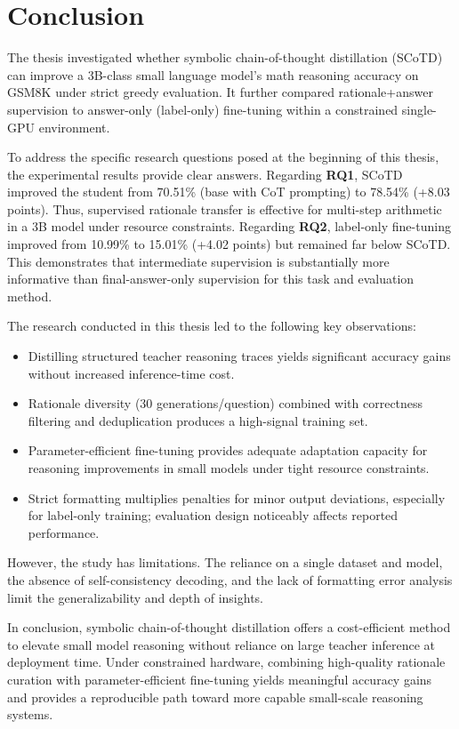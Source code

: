 \chapter{Conclusion}

The thesis investigated whether symbolic chain-of-thought distillation (SCoTD) can improve a 3B-class small language model's math reasoning accuracy on GSM8K under strict greedy evaluation. It further compared rationale+answer supervision to answer-only (label-only) fine-tuning within a constrained single-GPU environment.

To address the specific research questions posed at the beginning of this thesis, the experimental results provide clear answers. Regarding \textbf{RQ1}, SCoTD improved the student from 70.51\% (base with CoT prompting) to 78.54\% (+8.03 points). Thus, supervised rationale transfer is effective for multi-step arithmetic in a 3B model under resource constraints. Regarding \textbf{RQ2}, label-only fine-tuning improved from 10.99\% to 15.01\% (+4.02 points) but remained far below SCoTD. This demonstrates that intermediate supervision is substantially more informative than final-answer-only supervision for this task and evaluation method.

The research conducted in this thesis led to the following key observations:
\begin{itemize}
    \item Distilling structured teacher reasoning traces yields significant accuracy gains without increased inference-time cost.
    \item Rationale diversity (30 generations/question) combined with correctness filtering and deduplication produces a high-signal training set.
    \item Parameter-efficient fine-tuning provides adequate adaptation capacity for reasoning improvements in small models under tight resource constraints.
    \item Strict formatting multiplies penalties for minor output deviations, especially for label-only training; evaluation design noticeably affects reported performance.
\end{itemize}

However, the study has limitations. The reliance on a single dataset and model, the absence of self-consistency decoding, and the lack of formatting error analysis limit the generalizability and depth of insights.

In conclusion, symbolic chain-of-thought distillation offers a cost-efficient method to elevate small model reasoning without reliance on large teacher inference at deployment time. Under constrained hardware, combining high-quality rationale curation with parameter-efficient fine-tuning yields meaningful accuracy gains and provides a reproducible path toward more capable small-scale reasoning systems.

